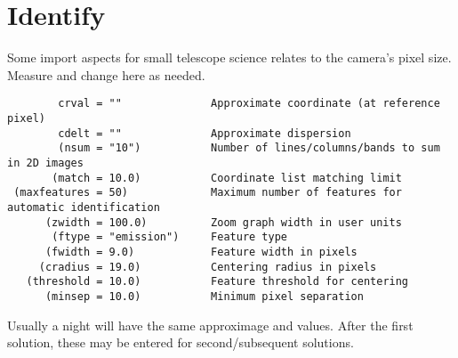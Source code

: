 \section{Identify}

Some import aspects for small telescope science relates
to the camera's pixel size. Measure and change here as needed.

\begingroup \fontsize{10pt}{10pt}
\selectfont
\begin{verbatim} 
        crval = ""              Approximate coordinate (at reference pixel)
        cdelt = ""              Approximate dispersion
        (nsum = "10")           Number of lines/columns/bands to sum in 2D images
       (match = 10.0)           Coordinate list matching limit
 (maxfeatures = 50)             Maximum number of features for automatic identification
      (zwidth = 100.0)          Zoom graph width in user units
       (ftype = "emission")     Feature type
      (fwidth = 9.0)            Feature width in pixels
     (cradius = 19.0)           Centering radius in pixels
   (threshold = 10.0)           Feature threshold for centering
      (minsep = 10.0)           Minimum pixel separation
\end{verbatim}
\endgroup

Usually a night will have the same approximage  and
 values.  After the first solution, these may be entered
for second/subsequent solutions.



